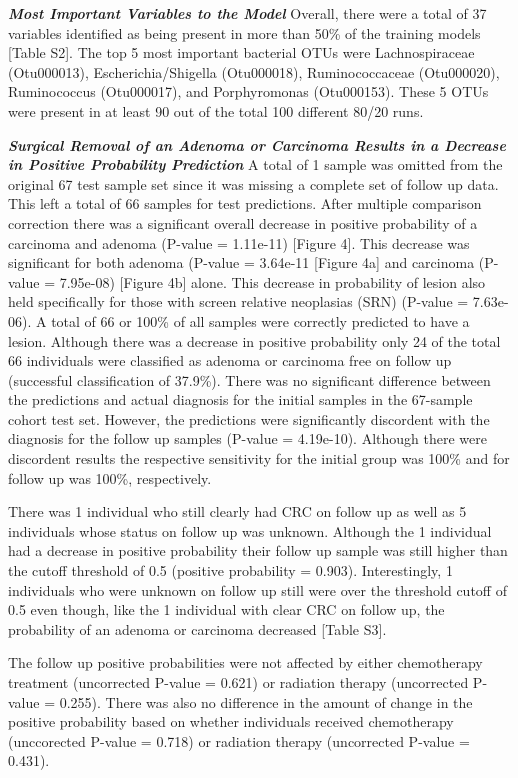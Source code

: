 \documentclass[12pt,]{article}
\begin{document}
\textbf{\emph{Most Important Variables to the Model}} Overall, there
were a total of 37 variables identified as being present in more than
50\% of the training models {[}Table S2{]}. The top 5 most important
bacterial OTUs were Lachnospiraceae (Otu000013), Escherichia/Shigella
(Otu000018), Ruminococcaceae (Otu000020), Ruminococcus (Otu000017), and
Porphyromonas (Otu000153). These 5 OTUs were present in at least 90 out
of the total 100 different 80/20 runs.

\textbf{\emph{Surgical Removal of an Adenoma or Carcinoma Results in a
Decrease in Positive Probability Prediction}} A total of 1 sample was
omitted from the original 67 test sample set since it was missing a
complete set of follow up data. This left a total of 66 samples for test
predictions. After multiple comparison correction there was a
significant overall decrease in positive probability of a carcinoma and
adenoma (P-value = 1.11e-11) {[}Figure 4{]}. This decrease was
significant for both adenoma (P-value = 3.64e-11 {[}Figure 4a{]} and
carcinoma (P-value = 7.95e-08) {[}Figure 4b{]} alone. This decrease in
probability of lesion also held specifically for those with screen
relative neoplasias (SRN) (P-value = 7.63e-06). A total of 66 or 100\%
of all samples were correctly predicted to have a lesion. Although there
was a decrease in positive probability only 24 of the total 66
individuals were classified as adenoma or carcinoma free on follow up
(successful classification of 37.9\%). There was no significant
difference between the predictions and actual diagnosis for the initial
samples in the 67-sample cohort test set. However, the predictions were
significantly discordent with the diagnosis for the follow up samples
(P-value = 4.19e-10). Although there were discordent results the
respective sensitivity for the initial group was 100\% and for follow up
was 100\%, respectively.

There was 1 individual who still clearly had CRC on follow up as well as
5 individuals whose status on follow up was unknown. Although the 1
individual had a decrease in positive probability their follow up sample
was still higher than the cutoff threshold of 0.5 (positive probability
= 0.903). Interestingly, 1 individuals who were unknown on follow up
still were over the threshold cutoff of 0.5 even though, like the 1
individual with clear CRC on follow up, the probability of an adenoma or
carcinoma decreased {[}Table S3{]}.

The follow up positive probabilities were not affected by either
chemotherapy treatment (uncorrected P-value = 0.621) or radiation
therapy (uncorrected P-value = 0.255). There was also no difference in
the amount of change in the positive probability based on whether
individuals received chemotherapy (unccorected P-value = 0.718) or
radiation therapy (uncorrected P-value = 0.431).
\end{document}
